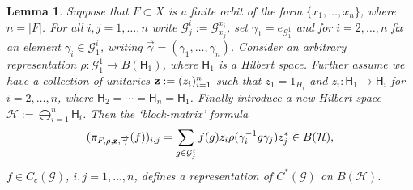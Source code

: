 \documentclass[10pt,a4paper]{amsart}
\newtheorem{lemma}{Lemma}
\newcommand{\GG}{\mathcal{G}}
\newcommand{\Hil}{\mathsf{H}}
\begin{document}
\begin{lemma}\label{lem:concreteform}
Suppose that $F\subset X$ is a finite orbit of the form $\{x_1, \ldots, x_n\}$, where $n = |F|$. For all $i,j=1, \ldots, n$ write $\GG_{j}^i:= \GG_{x_j}^{x_{i}}$, set $\gamma_{1}=e_{\GG_1^1}$   and for $i=2,\ldots, n$ fix  an element $\gamma_i \in \GG_{1}^{i}$, writing $\overrightarrow{\gamma}=(\gamma_1, \ldots, \gamma_n)$. Consider an arbitrary representation $\rho: \GG_{1}^1 \to B(\Hil_1)$, where $\Hil_1$ is a Hilbert space. Further assume we have a collection of unitaries ${\bf{z}}:=(z_i)_{i=1}^{n}$ such that $z_1=1_{H_i}$ and $z_i:\Hil_1\to \Hil_{i}$ for $i=2,\ldots, n$, where $\Hil_2=\cdots=\Hil_n = \Hil_1$. Finally
introduce a new Hilbert space $\mathcal{H}:=\bigoplus_{i=1}^n \Hil_i$. Then the `block-matrix' formula
\[ (\pi_{F, \rho, \bf{z}, \overrightarrow{\gamma}} (f))_{i,j} = \sum_{g \in \GG_j^i} f(g) z_{i} \rho (\gamma_{i}^{-1}g \gamma_{j}) z_j^*\in B(\mathcal{H}),  \]
$f \in C_c(\GG)$, $i,j=1, \ldots, n$,
defines a representation of $C^*(\GG)$ on $B(\mathcal{H})$.
	\end{lemma}
\end{document}

